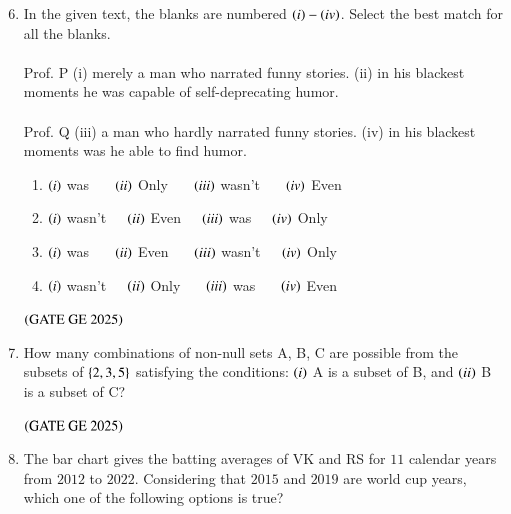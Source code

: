 \documentclass[journal,12pt,onecolumn]{IEEEtran}
\theoremstyle{remark}
\begin{document}
\begin{enumerate}
\setcounter{enumi}{5}
\item In the given text, the blanks are numbered $\left(i\right)-\left(iv\right)$.
Select the best match for all the blanks. \\
\\Prof. P \underline{\hspace{1cm}} (i) \underline{\hspace{1cm}} merely a man who narrated funny stories.
\underline{\hspace{1cm}} (ii) \underline{\hspace{1cm}} in his blackest moments he was capable of self-deprecating humor. \\
\\Prof.
Q \underline{\hspace{1cm}} (iii) \underline{\hspace{1cm}} a man who hardly narrated funny stories.
\underline{\hspace{1cm}} (iv) \underline{\hspace{1cm}} in his blackest moments was he able to find humor.
\begin{enumerate}
\item $\left(i\right)$ was \ \ \ $\left(ii\right)$ Only \ \ \   $\left(iii\right)$ wasn't \ \ \ $\left(iv\right)$ Even
\item $\left(i\right)$ wasn't\ \ \  $\left(ii\right)$ Even\ \ \  $\left(iii\right)$ was\ \ \  $\left(iv\right)$ Only
\item $\left(i\right)$ was \ \ \ $\left(ii\right)$ Even \ \ \ $\left(iii\right)$ wasn't\ \ \  $\left(iv\right)$ Only
\item $\left(i\right)$ wasn't\ \ \  $\left(ii\right)$ Only \ \ \ $\left(iii\right)$ was \ \ \ $\left(iv\right)$ Even
\end{enumerate}
\hfill $\left(\text{GATE GE 2025}\right)$
\bigskip
\item How many combinations of non-null sets A, B, C are possible from the subsets of $\left\{2,3,5\right\}$ satisfying the conditions: $\left(i\right)$ A is a subset of B, and 
$\left(ii\right)$ B is a subset of C?
\begin{enumerate}
\end{enumerate}
\hfill $\left(\text{GATE GE 2025}\right)$
\bigskip
\item The bar chart gives the batting averages of VK and RS for $11$ calendar years from $2012$ to $2022$. Considering that $2015$ and $2019$ are world cup years, which one of the following options is true?\\

\end{enumerate}
\end{document}
